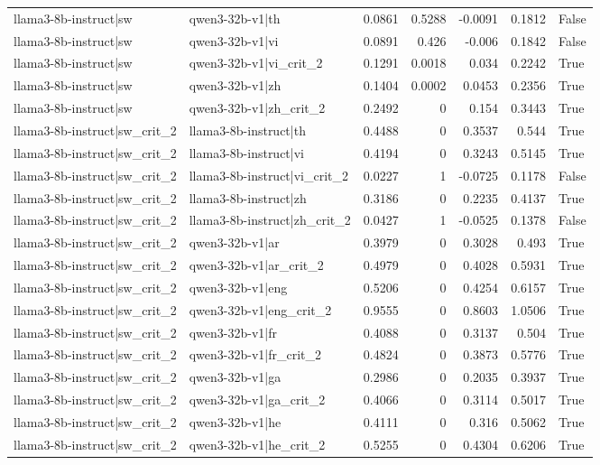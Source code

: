 \begin{table}
\begin{tabular}{l l r r r r l}
llama3-8b-instruct|sw & qwen3-32b-v1|th & 0.0861 & 0.5288 & -0.0091 & 0.1812 & False \\
llama3-8b-instruct|sw & qwen3-32b-v1|vi & 0.0891 & 0.426 & -0.006 & 0.1842 & False \\
llama3-8b-instruct|sw & qwen3-32b-v1|vi_crit_2 & 0.1291 & 0.0018 & 0.034 & 0.2242 & True \\
llama3-8b-instruct|sw & qwen3-32b-v1|zh & 0.1404 & 0.0002 & 0.0453 & 0.2356 & True \\
llama3-8b-instruct|sw & qwen3-32b-v1|zh_crit_2 & 0.2492 & 0 & 0.154 & 0.3443 & True \\
llama3-8b-instruct|sw_crit_2 & llama3-8b-instruct|th & 0.4488 & 0 & 0.3537 & 0.544 & True \\
llama3-8b-instruct|sw_crit_2 & llama3-8b-instruct|vi & 0.4194 & 0 & 0.3243 & 0.5145 & True \\
llama3-8b-instruct|sw_crit_2 & llama3-8b-instruct|vi_crit_2 & 0.0227 & 1 & -0.0725 & 0.1178 & False \\
llama3-8b-instruct|sw_crit_2 & llama3-8b-instruct|zh & 0.3186 & 0 & 0.2235 & 0.4137 & True \\
llama3-8b-instruct|sw_crit_2 & llama3-8b-instruct|zh_crit_2 & 0.0427 & 1 & -0.0525 & 0.1378 & False \\
llama3-8b-instruct|sw_crit_2 & qwen3-32b-v1|ar & 0.3979 & 0 & 0.3028 & 0.493 & True \\
llama3-8b-instruct|sw_crit_2 & qwen3-32b-v1|ar_crit_2 & 0.4979 & 0 & 0.4028 & 0.5931 & True \\
llama3-8b-instruct|sw_crit_2 & qwen3-32b-v1|eng & 0.5206 & 0 & 0.4254 & 0.6157 & True \\
llama3-8b-instruct|sw_crit_2 & qwen3-32b-v1|eng_crit_2 & 0.9555 & 0 & 0.8603 & 1.0506 & True \\
llama3-8b-instruct|sw_crit_2 & qwen3-32b-v1|fr & 0.4088 & 0 & 0.3137 & 0.504 & True \\
llama3-8b-instruct|sw_crit_2 & qwen3-32b-v1|fr_crit_2 & 0.4824 & 0 & 0.3873 & 0.5776 & True \\
llama3-8b-instruct|sw_crit_2 & qwen3-32b-v1|ga & 0.2986 & 0 & 0.2035 & 0.3937 & True \\
llama3-8b-instruct|sw_crit_2 & qwen3-32b-v1|ga_crit_2 & 0.4066 & 0 & 0.3114 & 0.5017 & True \\
llama3-8b-instruct|sw_crit_2 & qwen3-32b-v1|he & 0.4111 & 0 & 0.316 & 0.5062 & True \\
llama3-8b-instruct|sw_crit_2 & qwen3-32b-v1|he_crit_2 & 0.5255 & 0 & 0.4304 & 0.6206 & True \\

\end{tabular}
\end{table}
